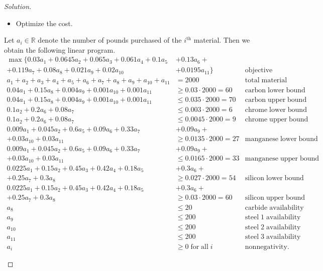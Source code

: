 \documentclass[ 12pt ]{article}
\begin{document}
\begin{enumerate}
\begin{proof}[Solution]
\begin{enumerate}
\begin{itemize}
\begin{center}
							\end{center}
						\item Optimize the cost.
					\end{itemize}
					Let $a_i \in \mathbb{R}$ denote the number of pounds purchased of the $i^{\mathrm{th}}$ material. Then we obtain the following linear program.
					\begin{align*}
						\max \{ 0.03a_1 + 0.0645a_2 + 0.065a_3 + 0.061a_4 + 0.1a_5 &+ 0.13a_6 + \\
							+ 0.119a_7 + 0.08a_8 + 0.021a_9 + 0.02a_{10} &+ 0.0195a_{11} \} &\mathrm{objective} \\
						a_1 + a_2 + a_3 + a_4 + a_5 + a_6 + a_7 + a_8 + a_9 + a_{10} + a_{11} &= 2000 &\mathrm{total\; material} \\
						0.04a_1 + 0.15a_8 + 0.004a_9 + 0.001a_{10} + 0.001a_{11} &\geq 0.03 \cdot 2000 = 60 &\mathrm{carbon\; lower\; bound} \\
						0.04a_1 + 0.15a_8 + 0.004a_9 + 0.001a_{10} + 0.001a_{11} &\leq 0.035 \cdot 2000 = 70 &\mathrm{carbon\; upper\; bound} \\
						0.1a_2 + 0.2a_6 + 0.08a_7 &\leq 0.003 \cdot 2000 = 6 &\mathrm{chrome\; lower\; bound} \\
						0.1a_2 + 0.2a_6 + 0.08a_7 &\leq 0.0045 \cdot 2000 = 9 &\mathrm{chrome\; upper\; bound} \\
						0.009a_1 + 0.045a_2 + 0.6a_5 + 0.09a_6 + 0.33a_7 &+ 0.09a_9 + \\
							+ 0.03a_{10} + 0.03a_{11} &\geq 0.0135 \cdot 2000 = 27 &\mathrm{manganese\; lower\; bound} \\
						0.009a_1 + 0.045a_2 + 0.6a_5 + 0.09a_6 + 0.33a_7 &+ 0.09a_9 + \\
							+ 0.03a_{10} + 0.03a_{11} &\leq 0.0165 \cdot 2000 = 33 &\mathrm{manganese\; upper\; bound} \\
						0.0225a_1 + 0.15a_2 + 0.45a_3 + 0.42a_4 + 0.18a_5 &+ 0.3a_6 +\\
							+ 0.25a_7 + 0.3a_8 &\geq 0.027 \cdot 2000 = 54 &\mathrm{silicon\; lower\; bound} \\
						0.0225a_1 + 0.15a_2 + 0.45a_3 + 0.42a_4 + 0.18a_5 &+ 0.3a_6 + \\
							+ 0.25a_7 + 0.3a_8 &\geq 0.03 \cdot 2000 = 60 &\mathrm{silicon\; upper\; bound} \\
						a_8 &\leq 20 &\mathrm{carbide\; availability} \\
						a_9 &\leq 200 &\mathrm{steel\; 1\; availability} \\
						a_{10} &\leq 200 &\mathrm{steel\; 2\; availability} \\
						a_{11} &\leq 200 &\mathrm{steel\; 3\; availability} \\
						a_i &\geq 0\; \mathrm{for\; all\;} i &\mathrm{nonnegativity}.
					\end{align*}


\end{enumerate}
\end{proof}
\end{enumerate}
\end{document}
